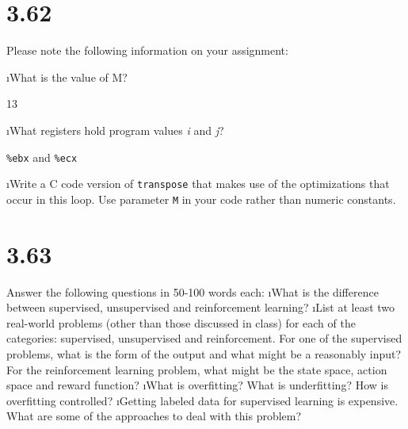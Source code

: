 \documentclass[fleqn]{article}
\begin{document}


\section{3.62}

Please note the following information on your assignment:

\bee
\i What is the value of M?

\begin{solution}
13
\end{solution}

\i What registers hold program values \textit{i} and \textit{j}?

\begin{solution}
\texttt{\%ebx} and \texttt{\%ecx}
\end{solution}

\i Write a C code version of \texttt{transpose} that makes use of the optimizations that occur in this loop. Use parameter \texttt{M} in your code rather than numeric constants.

\begin{solution}
\end{solution}

\ene

\section{3.63}

Answer the following questions in 50-100 words each:
\bee
\i What is the difference between supervised, unsupervised and reinforcement learning?
\i List at least two real-world problems (other than those discussed in class) for each of the categories:
  supervised, unsupervised and reinforcement. For one of the supervised problems, what is the form
  of the output and what might be a reasonably input? For the reinforcement learning problem, what
  might be the state space, action space and reward function?
\i What is overfitting? What is underfitting? How is overfitting controlled?
\i Getting labeled data for supervised learning is expensive. What are some of the 
   approaches to deal with this problem?

\ene
\end{document}
